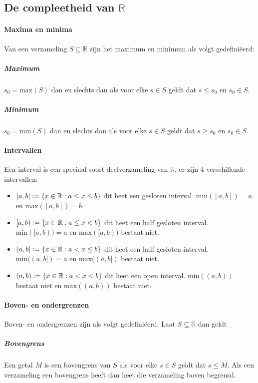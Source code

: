 \subsection{De compleetheid van $\mathbb{R}$}

\paragraph{Maxima en minima} Van een verzameling $S\subseteq\mathbb{R}$ zijn het maximum en minimum als volgt gedefiniëerd:
\subparagraph{Maximum} $s_{0} = \text{max}(S)$ dan en slechts dan als voor elke $s \in S$ geldt dat $s \leq s_{0}$ en $s_{0} \in S$.
\subparagraph{Minimum}$s_{0} = \text{min}(S)$ dan en slechts dan als voor elke $s \in S$ geldt dat $s \geq s_{0}$ en $s_{0} \in S$.

\paragraph{Intervallen} Een interval is een speciaal soort deelverzameling van $\mathbb{R}$, er zijn 4 verschillende intervallen:
\begin{itemize}
    \setlength\itemsep{0em}
    \item $[a,b]\vcentcolon=\{x\in\mathbb{R}:a \leq x \leq b\}$ dit heet een gesloten interval. $\text{min}([a,b])=a$ en $\text{max}([a,b])=b$.
    \item $[a,b)\vcentcolon=\{x\in\mathbb{R}:a \leq x < b\}$ dit heet een half gesloten interval. $\text{min}([a,b))=a$ en $\text{max}([a,b))$ bestaat niet.
    \item $(a,b]\vcentcolon=\{x\in\mathbb{R}:a < x \leq b\}$ dit heet een half gesloten interval. $\text{min}((a,b])=a$ en $\text{max}((a,b])$ bestaat niet.
    \item $(a,b)\vcentcolon=\{x\in\mathbb{R}:a < x < b\}$ dit heet een open interval. $\text{min}((a,b))$ bestaat niet en $\text{max}((a,b))$ bestaat niet.
\end{itemize}

\paragraph{Boven- en ondergrenzen} Boven- en ondergrenzen zijn als volgt gedefiniëerd: Laat $S\subseteq\mathbb{R}$ dan geldt

\subparagraph{Bovengrens} Een getal $M$ is een bovengrens van $S$ als voor elke $s \in S$ geldt dat $s \leq M$. Als een verzameling een bovengrens heeft dan heet die verzameling boven begrensd.


